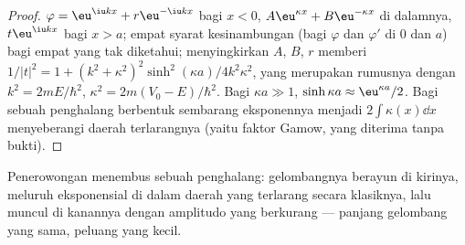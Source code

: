 \begin{proof}
$\varphi = \eu^{\iu kx} + r\eu^{-\iu kx}$ bagi $x < 0$, $A\eu^{\kappa x} + B\eu^{-\kappa x}$
di dalamnya, $t\eu^{\iu kx}$ bagi $x > a$; empat syarat kesinambungan (bagi $\varphi$
dan $\varphi'$ di $0$ dan $a$) bagi empat yang tak diketahui; menyingkirkan $A$, $B$, $r$
memberi $1/|t|^2 = 1 + (k^2 + \kappa^2)^2\sinh^2(\kappa a)/4k^2\kappa^2$, yang merupakan
rumusnya dengan $k^2 = 2mE/\hbar^2$, $\kappa^2 = 2m(V_0 - E)/\hbar^2$. Bagi
$\kappa a \gg 1$, $\sinh\kappa a \approx \eu^{\kappa a}/2$. Bagi sebuah penghalang berbentuk
sembarang eksponennya menjadi $2\int\kappa(x)\dd x$ menyeberangi
daerah terlarangnya (yaitu faktor Gamow, yang diterima tanpa bukti).
\end{proof}

\begin{omfigure}

{\small Penerowongan menembus sebuah penghalang: gelombangnya berayun di kirinya,
meluruh eksponensial di dalam daerah yang terlarang secara klasiknya, lalu
muncul di kanannya dengan amplitudo yang berkurang --- panjang gelombang yang sama,
peluang yang kecil.}
\end{omfigure}

